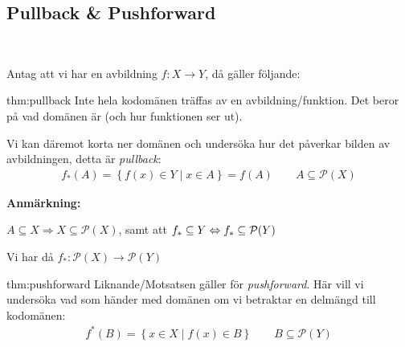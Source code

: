 \subsection{Pullback \& Pushforward}\hfill\\\par
\noindent Antag att vi har en avbildning $f: X\to Y$, då gäller följande:
\par\bigskip
\begin{theo}[Pullback]{thm:pullback}
  Inte hela kodomänen träffas av en avbildning/funktion. Det beror på vad domänen är (och hur funktionen ser ut).\par
  \noindent Vi kan däremot korta ner domänen och undersöka hur det påverkar bilden av avbildningen, detta är \textit{pullback}:
  \begin{equation*}
    \begin{gathered}
      f_*(A) = \left\{f(x)\in Y\;|\; x\in A\right\} = f(A)\qquad A\subseteq\mathcal{P}(X)
    \end{gathered}
  \end{equation*}
  \par\bigskip
  \noindent\textbf{Anmärkning:}\par
  $A\subseteq X\Rightarrow X\subseteq\mathcal{P}(X)$, samt att $f_*\subseteq Y\Leftrightarrow f_*\subseteq\mathcal{P}(Y)$\par
  Vi har då $f_*:\mathcal{P}(X)\to\mathcal{P}(Y)$
\end{theo}
\par\bigskip
\begin{theo}[Pushforward]{thm:pushforward}
  Liknande/Motsatsen gäller för \textit{pushforward}. Här vill vi undersöka vad som händer med domänen om vi betraktar en delmängd till kodomänen:
  \begin{equation*}
    \begin{gathered}
      f^*(B) = \left\{x\in X\;|\; f(x)\in B\right\}\qquad B\subseteq\mathcal{P}(Y)
    \end{gathered}
  \end{equation*}
\end{theo}
